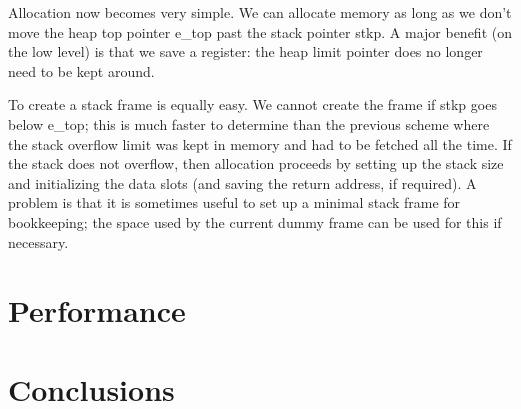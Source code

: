 Allocation now becomes very simple. We can allocate memory as long as we
don't move the heap top pointer {\sc e\_top} past the stack pointer {\sc stkp}.
A major benefit (on the low level) is that we save a register: the heap limit
pointer does no longer need to be kept around.

To create a stack frame is equally easy. We cannot create the frame if {\sc
stkp} goes below {\sc e\_top}; this is much faster to determine than the
previous scheme where the stack overflow limit was kept in memory and had to
be fetched all the time. If the stack does not overflow, then allocation
proceeds by setting up the stack size and initializing the data slots (and
saving the return address, if required). A problem is that it is sometimes
useful to set up a minimal stack frame for bookkeeping; the space used by
the current dummy frame can be used for this if necessary.

\section{Performance}

\section{Conclusions}


